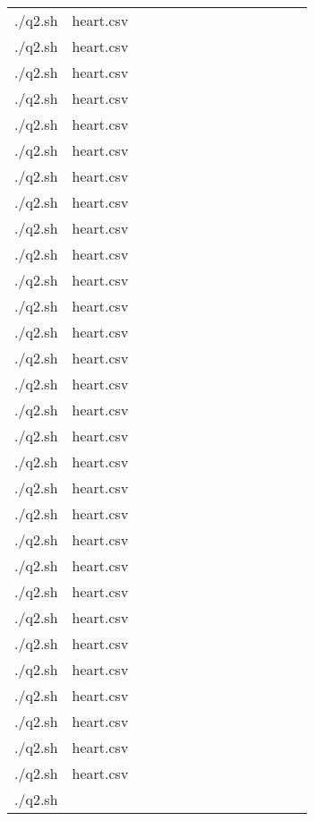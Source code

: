 \documentclass{article}
\begin{document}
\begin{table}[h!]
\begin{tabular}{|c|c|c|c|c|c|c|c|c|c|c|c|c|c|}
&  &  &  &  &  &  &  &  &  &  &  \\ \hline./q2.sh & heart.csv &  &  &  &  &  &  &  &  &  &  &  &  \\ \hline./q2.sh & heart.csv &  &  &  &  &  &  &  &  &  &  &  &  \\ \hline./q2.sh & heart.csv &  &  &  &  &  &  &  &  &  &  &  &  \\ \hline./q2.sh & heart.csv &  &  &  &  &  &  &  &  &  &  &  &  \\ \hline./q2.sh & heart.csv &  &  &  &  &  &  &  &  &  &  &  &  \\ \hline./q2.sh & heart.csv &  &  &  &  &  &  &  &  &  &  &  &  \\ \hline./q2.sh & heart.csv &  &  &  &  &  &  &  &  &  &  &  &  \\ \hline./q2.sh & heart.csv &  &  &  &  &  &  &  &  &  &  &  &  \\ \hline./q2.sh & heart.csv &  &  &  &  &  &  &  &  &  &  &  &  \\ \hline./q2.sh & heart.csv &  &  &  &  &  &  &  &  &  &  &  &  \\ \hline./q2.sh & heart.csv &  &  &  &  &  &  &  &  &  &  &  &  \\ \hline./q2.sh & heart.csv &  &  &  &  &  &  &  &  &  &  &  &  \\ \hline./q2.sh & heart.csv &  &  &  &  &  &  &  &  &  &  &  &  \\ \hline./q2.sh & heart.csv &  &  &  &  &  &  &  &  &  &  &  &  \\ \hline./q2.sh & heart.csv &  &  &  &  &  &  &  &  &  &  &  &  \\ \hline./q2.sh & heart.csv &  &  &  &  &  &  &  &  &  &  &  &  \\ \hline./q2.sh & heart.csv &  &  &  &  &  &  &  &  &  &  &  &  \\ \hline./q2.sh & heart.csv &  &  &  &  &  &  &  &  &  &  &  &  \\ \hline./q2.sh & heart.csv &  &  &  &  &  &  &  &  &  &  &  &  \\ \hline./q2.sh & heart.csv &  &  &  &  &  &  &  &  &  &  &  &  \\ \hline./q2.sh & heart.csv &  &  &  &  &  &  &  &  &  &  &  &  \\ \hline./q2.sh & heart.csv &  &  &  &  &  &  &  &  &  &  &  &  \\ \hline./q2.sh & heart.csv &  &  &  &  &  &  &  &  &  &  &  &  \\ \hline./q2.sh & heart.csv &  &  &  &  &  &  &  &  &  &  &  &  \\ \hline./q2.sh & heart.csv &  &  &  &  &  &  &  &  &  &  &  &  \\ \hline./q2.sh & heart.csv &  &  &  &  &  &  &  &  &  &  &  &  \\ \hline./q2.sh & heart.csv &  &  &  &  &  &  &  &  &  &  &  &  \\ \hline./q2.sh & heart.csv &  &  &  &  &  &  &  &  &  &  &  &  \\ \hline./q2.sh & heart.csv &  &  &  &  &  &  &  &  &  &  &  &  \\ \hline./q2.sh & heart.csv &  &  &  &  &  &  &  &  &  &  &  &  \\ \hline./q2.sh & 
\end{tabular}
\end{table}
\end{document}
